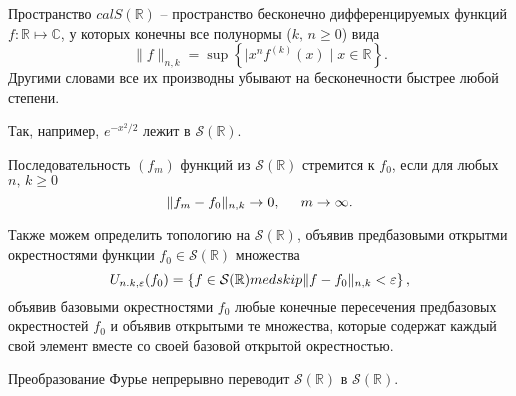

\begin{to_def}
    Пространство $cal S (\mathbb{R})$ -- пространство бесконечно дифференцируемых функций $f\colon \mathbb{R} \mapsto \mathbb{C}$, у которых конечны все полунормы ($k,\, n \geq 0$) вида
    \begin{equation*}
        \|f\|_{n,k} = \sup\left\{
            |x^n f^{(k)} (x) \mid x \in \mathbb{R}
        \right\}.
    \end{equation*}
    Другими словами все их производны убывают на бесконечности быстрее любой степени. 
\end{to_def}

Так, например, $e^{-x^2/2}$ лежит в $\mathcal S (\mathbb{R})$. 



\begin{to_def}
    Последовательность $(f_m)$ функций из $\mathcal S (\mathbb{R})$ стремится к $f_0$, если для любых $n,\, k \geq 0$
    \begin{equation*}
        \|f_m - f_0\|_{n, k} \to 0, \hspace{5 mm}  m \to \infty.
    \end{equation*}
\end{to_def}


Также можем определить топологию на $\mathcal S(\mathbb{R})$, объявив предбазовыми открытми окрестностями функции $f_0 \in \mathcal S(\mathbb{R})$ множества
\begin{equation*}
    U_{n. k, \varepsilon} (f_0) = \left\{
        f \in \mathcal S(\mathbb{R}) \\medskip
        \|f-f_0\|_{n, k} < \varepsilon
    \right\},
\end{equation*}
объявив базовыми окрестностями $f_0$ любые конечные пересечения предбазовых окрестностей $f_0$ и объявив открытыми те множества, которые содержат каждый свой элемент вместе со своей базовой открытой окрестностью. 

\begin{to_thr}[]
    Преобразование Фурье непрерывно переводит $\mathcal S\left(\mathbb{R}\right)$ в $\mathcal S(\mathbb{R})$. 
\end{to_thr}

